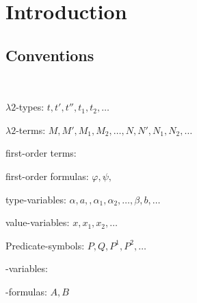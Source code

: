 \section{Introduction}

\subsection{Conventions}
~

$\lambda2$-types: $t, t', t'', t_1, t_2, \dots$

$\lambda2$-terms: $M, M', M_1, M_2,\dots, N, N', N_1, N_2, \dots$

first-order terms: 

first-order formulas: $\varphi,\psi,$

type-variables: $\alpha, a, ,\alpha_1, \alpha_2, \dots, \beta, b, \dots$

value-variables: $x, x_1 , x_2 ,\dots$

Predicate-symbols: $P,Q,P^1,P^2,\dots$

\SysP-variables:

\SysP-formulas: $A, B$

